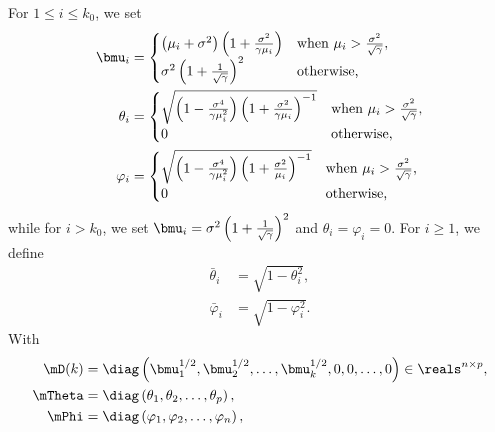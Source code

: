 For $1 \leq i \leq k_0$, we set
\begin{align*}
    \bmu_i
        &=
        \begin{cases}
            \left( \mu_i + \sigma^2 \right)
            \left( 1 + \frac{\sigma^2}{\gamma \mu_i} \right)
                &\text{when $\mu_i > \frac{\sigma^2}{\sqrt{\gamma}}$}, \\
            \sigma^2 \left( 1 + \frac{1}{\sqrt{\gamma}} \right)^2
                &\text{otherwise,}
        \end{cases} \\
    \theta_i 
        &=
        \begin{cases}
            \sqrt{ 
                \left( 1 - \frac{\sigma^4}{ \gamma \mu_i^2} \right) 
                \left( 1 + \frac{\sigma^2}{ \gamma \mu_i  } \right)^{-1} }
            &\text{when $\mu_i > \frac{\sigma^2}{\sqrt{\gamma}}$,} \\
            0
            &\text{otherwise,}
        \end{cases} \\
    \varphi_i
        &=
        \begin{cases}
            \sqrt{
                \left( 1 - \frac{\sigma^4}{ \gamma \mu_i^2} \right)
                \left( 1 + \frac{\sigma^2}{ \mu_i  } \right)^{-1} }
            &\text{when $\mu_i > \frac{\sigma^2}{\sqrt{\gamma}}$,} \\
            0
            &\text{otherwise,}
        \end{cases}
\end{align*}
while for $i > k_0$, we set 
$\bmu_i = \sigma^2 \left( 1 + \frac{1}{\sqrt{\gamma}} \right)^2$ 
and $\theta_i = \varphi_i = 0$.  For $i \geq 1$, we
define
\begin{align*}
    \bar \theta_i  &= \sqrt{ 1 - \theta_i^2 }, \\
    \bar \varphi_i &= \sqrt{ 1 - \varphi_i^2 }.
\end{align*}
With
\begin{align*}
    \mD(k) 
        &= 
            \diag\left( 
                \bmu_1^{1/2}, 
                \bmu_2^{1/2}, 
                \ldots,
                \bmu_k^{1/2},
                0,
                0,
                \ldots,
                0
            \right) \in \reals^{n \times p}, \\
    \mTheta
        &=
            \diag\left(
                \theta_1,
                \theta_2,
                \ldots,
                \theta_p
            \right), \\
    \mPhi
        &=
            \diag\left(
                \varphi_1,
                \varphi_2,
                \ldots,
                \varphi_n
            \right),
\end{align*}
